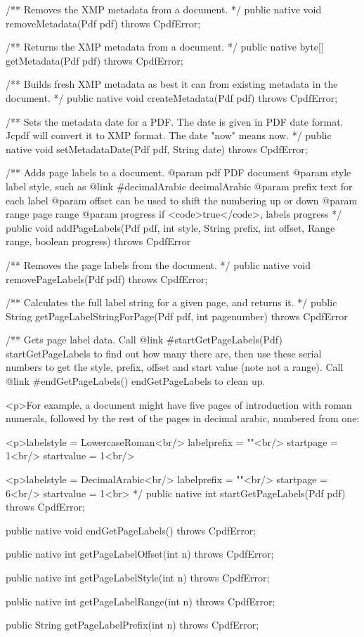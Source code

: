 /** Removes the XMP metadata from a document. */
public native void removeMetadata(Pdf pdf) throws CpdfError;

/** Returns the XMP metadata from a document. */
public native byte[] getMetadata(Pdf pdf) throws CpdfError;

/** Builds fresh XMP metadata as best it can from
existing metadata in the document. */
public native void createMetadata(Pdf pdf) throws CpdfError;

/** Sets the metadata date for a PDF. The date is given in PDF date format.
Jcpdf will convert it to XMP format. The date "now" means now. */
public native void setMetadataDate(Pdf pdf, String date) throws CpdfError;

/** Adds page labels to a document.
@param pdf PDF document
@param style label style, such as {@link #decimalArabic decimalArabic}
@param prefix text for each label
@param offset can be used to shift the numbering up or down
@param range page range
@param progress if <code>true</code>, labels progress */
public void addPageLabels(Pdf pdf, int style, String prefix, int offset,
                          Range range, boolean progress)
    throws CpdfError

/** Removes the page labels from the document. */
public native void removePageLabels(Pdf pdf) throws CpdfError;

/** Calculates the full label string for a given page, and returns it. */
public String getPageLabelStringForPage(Pdf pdf, int pagenumber)
    throws CpdfError

/** Gets page label data. Call {@link #startGetPageLabels(Pdf)
startGetPageLabels} to find out how many there are, then use these serial
numbers to get the style, prefix, offset and start value (note not a
range). Call {@link #endGetPageLabels() endGetPageLabels} to clean up.

<p>For example, a document might have five pages of introduction with roman
numerals, followed by the rest of the pages in decimal arabic, numbered
from one:

<p>labelstyle = LowercaseRoman<br/>
labelprefix = ""<br/>
startpage = 1<br/>
startvalue = 1<br/>

<p>labelstyle = DecimalArabic<br/>
labelprefix = ""<br/>
startpage = 6<br/>
startvalue = 1<br> */
public native int startGetPageLabels(Pdf pdf) throws CpdfError;

public native void endGetPageLabels() throws CpdfError;

public native int getPageLabelOffset(int n) throws CpdfError;

public native int getPageLabelStyle(int n) throws CpdfError;

public native int getPageLabelRange(int n) throws CpdfError;

public String getPageLabelPrefix(int n) throws CpdfError;
